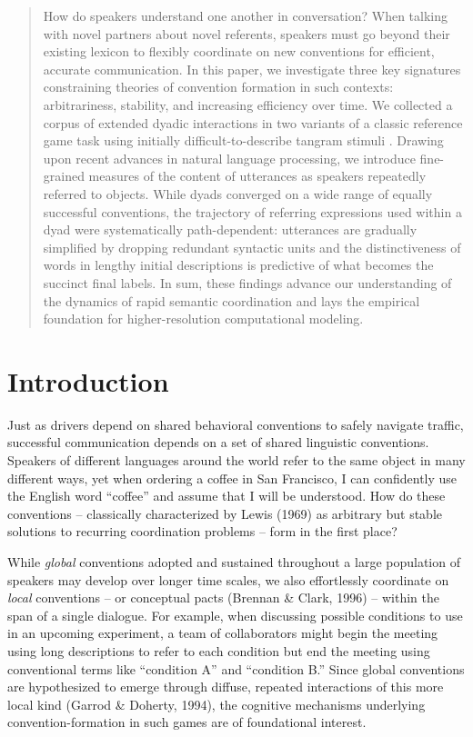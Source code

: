 \documentclass[manuscript]{stjour}
\begin{document}
\begin{abstract}
How do speakers understand one another in conversation? 
When talking with novel partners about novel referents, speakers must go beyond their existing lexicon to flexibly coordinate on new conventions for efficient, accurate communication.
In this paper, we investigate three key signatures constraining theories of convention formation in such contexts: arbitrariness, stability, and increasing efficiency over time. 
We collected a corpus of extended dyadic interactions in two variants of a classic reference game task using  initially difficult-to-describe tangram stimuli . 
Drawing upon recent advances in natural language processing, we introduce fine-grained measures of the content of utterances as speakers repeatedly referred to objects.
While dyads converged on a wide range of equally successful conventions, the trajectory of referring expressions used within a dyad were systematically path-dependent: 
utterances are gradually simplified by dropping redundant syntactic units and
the distinctiveness of words in lengthy initial descriptions is predictive of what becomes the succinct final labels.
In sum, these findings advance our understanding of the dynamics of rapid semantic coordination and lays the empirical foundation for higher-resolution computational modeling.
\end{abstract}

\section{Introduction}\label{introduction}

Just as drivers depend on shared behavioral conventions to safely
navigate traffic, successful communication depends on a set of shared
linguistic conventions. Speakers of different languages around the world
refer to the same object in many different ways, yet when ordering a
coffee in San Francisco, I can confidently use the English word
``coffee'' and assume that I will be understood. How do these
conventions -- classically characterized by Lewis (1969) as arbitrary
but stable solutions to recurring coordination problems -- form in the
first place?

While \emph{global} conventions adopted and sustained throughout a large
population of speakers may develop over longer time scales, we also
effortlessly coordinate on \emph{local} conventions -- or conceptual
pacts (Brennan \& Clark, 1996) -- within the span of a single dialogue.
For example, when discussing possible conditions to use in an upcoming
experiment, a team of collaborators might begin the meeting using long
descriptions to refer to each condition but end the meeting using
conventional terms like ``condition A'' and ``condition B.'' Since
global conventions are hypothesized to emerge through diffuse, repeated
interactions of this more local kind (Garrod \& Doherty, 1994), the
cognitive mechanisms underlying convention-formation in such games are
of foundational interest.
\end{document}
